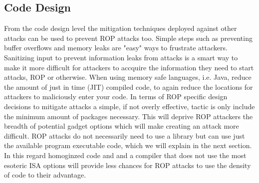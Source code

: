 \documentclass[11pt]{amsart}
\begin{document}
\subsection*{Code Design}
From the code design level the mitigation techniques deployed against other attacks can be used to prevent ROP attacks too. Simple steps such as preventing buffer overflows and memory leaks are "easy" ways to frustrate attackers. Sanitizing input to prevent information leaks from attacks is a smart way to make it more difficult for attackers to accquire the information they need to start attacks, ROP or otherwise. When using memory safe languages, i.e. Java, reduce the amount of just in time (JIT) compiled code, to again reduce the locations for attackers to maliciously enter your code.\newline \newline
In terms of ROP specific design decisions to mitigate attacks a simple, if not overly effective, tactic is only include the minimum amount of packages necessary. This will deprive ROP attackers the breadth of potential gadget options which will make creating an attack more difficult. ROP attacks do not necessarily need to use a library but can use just the available program executable code, which we will explain in the next section. In this regard homoginzed code and and a compiler that does not use the most esoteric ISA options will provide less chances for ROP attacks to use the density of code to their advantage.
\end{document}
